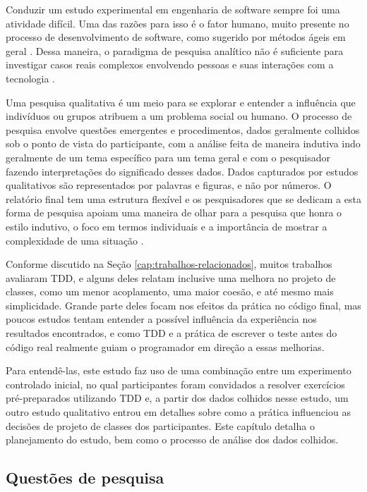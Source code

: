 \documentclass[conference]{IEEEtran}
\begin{document}
Conduzir um estudo experimental em engenharia de software sempre foi uma
atividade difícil. Uma das razões para isso é o fator humano, muito presente 
no processo de desenvolvimento de software, como sugerido por métodos ágeis  em
geral \cite{AgileManifesto}. Dessa maneira, o paradigma de pesquisa analítico 
não é suficiente para investigar casos reais complexos envolvendo pessoas e 
suas interações com a tecnologia \cite{guidelines-case-study}.

Uma pesquisa qualitativa é um meio para se explorar e entender a influência que 
indivíduos ou grupos atribuem a um problema social ou humano. O processo de
pesquisa envolve questões emergentes e procedimentos, dados geralmente colhidos
sob o ponto de vista do participante, com a análise feita de maneira indutiva
indo geralmente de um tema específico para um tema geral e com o pesquisador
fazendo interpretações do significado desses dados. Dados capturados por estudos
qualitativos são representados por palavras e figuras, e não por números.
O relatório final tem uma estrutura flexível e os pesquisadores que se
dedicam a esta forma de pesquisa apoiam uma maneira de olhar para a pesquisa que
honra o estilo indutivo, o foco em termos individuais e a importância de mostrar a 
complexidade de uma situação \cite{creswell}.

Conforme discutido na Seção \ref{cap:trabalhos-relacionados}, muitos 
trabalhos avaliaram TDD, e alguns deles relatam inclusive uma melhora
no projeto de classes, como um menor acoplamento, uma maior coesão, e até mesmo
mais simplicidade. 
Grande parte deles focam nos efeitos da prática no código final, mas poucos 
estudos tentam entender a possível influência da experiência
nos resultados encontrados, e como TDD e a prática de escrever o teste 
antes do código real realmente guiam o programador 
em direção a essas melhorias.

Para entendê-las, este estudo faz uso de uma combinação entre um experimento controlado inicial, no qual participantes foram
convidados a resolver exercícios pré-preparados utilizando TDD e, a partir dos dados colhidos nesse estudo, um outro
estudo qualitativo entrou em detalhes sobre como a prática influenciou as decisões de projeto de classes dos participantes.
Este capítulo detalha o planejamento do estudo, bem como o processo de análise dos dados colhidos.

\subsection{Questões de pesquisa}
\end{document}

